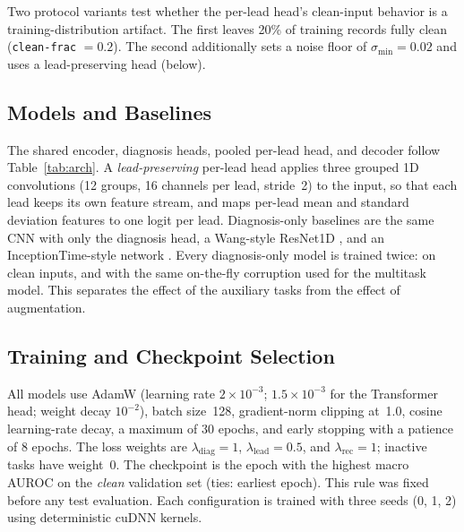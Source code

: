 Two protocol variants test whether the per-lead head's clean-input behavior is a training-distribution artifact. The first leaves 20\% of training records fully clean (\texttt{clean-frac} $=0.2$). The second additionally sets a noise floor of $\sigma_{\min}=0.02$ and uses a lead-preserving head (below).

\subsection{Models and Baselines}
The shared encoder, diagnosis heads, pooled per-lead head, and decoder follow Table~\ref{tab:arch}. A \emph{lead-preserving} per-lead head applies three grouped 1D convolutions (12 groups, 16 channels per lead, stride~2) to the input, so that each lead keeps its own feature stream, and maps per-lead mean and standard deviation features to one logit per lead. Diagnosis-only baselines are the same CNN with only the diagnosis head, a Wang-style ResNet1D \cite{wang2017time}, and an InceptionTime-style network \cite{ismail2020inceptiontime}. Every diagnosis-only model is trained twice: on clean inputs, and with the same on-the-fly corruption used for the multitask model. This separates the effect of the auxiliary tasks from the effect of augmentation.

\subsection{Training and Checkpoint Selection}
\label{subsec:training}
All models use AdamW (learning rate $2\times10^{-3}$; $1.5\times10^{-3}$ for the Transformer head; weight decay $10^{-2}$), batch size~128, gradient-norm clipping at~1.0, cosine learning-rate decay, a maximum of 30 epochs, and early stopping with a patience of 8 epochs. The loss weights are $\lambda_{\text{diag}}=1$, $\lambda_{\text{lead}}=0.5$, and $\lambda_{\text{rec}}=1$; inactive tasks have weight~0. The checkpoint is the epoch with the highest macro AUROC on the \emph{clean} validation set (ties: earliest epoch). This rule was fixed before any test evaluation. Each configuration is trained with three seeds (0, 1, 2) using deterministic cuDNN kernels.

